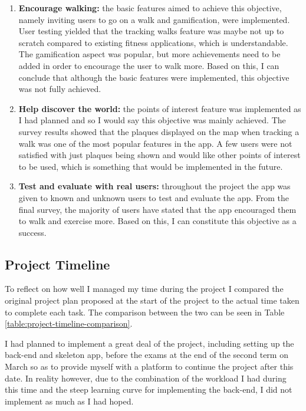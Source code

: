 \begin{enumerate}[label=\textbf{Obj \arabic*}]
  \item \textbf{Encourage walking:} the basic features aimed to achieve this objective, namely inviting users to go on a walk and gamification, were implemented. User testing yielded that the tracking walks feature was maybe not up to scratch compared to existing fitness applications, which is understandable. The gamification aspect was popular, but more achievements need to be added in order to encourage the user to walk more. Based on this, I can conclude that although the basic features were implemented, this objective was not fully achieved.

  \item \textbf{Help discover the world:} the points of interest feature was implemented as I had planned and so I would say this objective was mainly achieved. The survey results showed that the plaques displayed on the map when tracking a walk was one of the most popular features in the app. A few users were not satisfied with just plaques being shown and would like other points of interest to be used, which is something that would be implemented in the future.

  \item \textbf{Test and evaluate with real users:} throughout the project the app was given to known and unknown users to test and evaluate the app. From the final survey, the majority of users have stated that the app encouraged them to walk and exercise more. Based on this, I can constitute this objective as a success.
\end{enumerate}

\subsection{Project Timeline}

To reflect on how well I managed my time during the project I compared the original project plan proposed at the start of the project to the actual time taken to complete each task. The comparison between the two can be seen in Table \ref{table:project-timeline-comparison}.

I had planned to implement a great deal of the project, including setting up the back-end and skeleton app, before the exams at the end of the second term on  March so as to provide myself with a platform to continue the project after this date. In reality however, due to the combination of the workload I had during this time and the steep learning curve for implementing the back-end, I did not implement as much as I had hoped.

